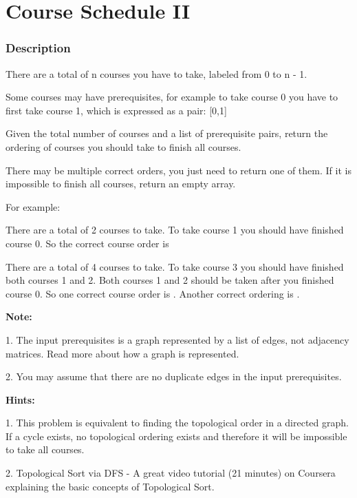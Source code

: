 \newpage

\section{Course Schedule II} %

\subsubsection{Description}

There are a total of n courses you have to take, labeled from 0 to n - 1.

Some courses may have prerequisites, for example to take course 0 you have to first take course 1, which is expressed as a pair: [0,1]

Given the total number of courses and a list of prerequisite pairs, return the ordering of courses you should take to finish all courses.

There may be multiple correct orders, you just need to return one of them. If it is impossible to finish all courses, return an empty array.

For example:


There are a total of 2 courses to take. To take course 1 you should have finished course 0. So the correct course order is \code{[0,1]}


There are a total of 4 courses to take. To take course 3 you should have finished both courses 1 and 2. Both courses 1 and 2 should be taken after you finished course 0. So one correct course order is \code{[0,1,2,3]}. Another correct ordering is \code{[0,2,1,3]}.

\textbf{Note:}

1. The input prerequisites is a graph represented by a list of edges, not adjacency matrices. Read more about how a graph is represented.

2. You may assume that there are no duplicate edges in the input prerequisites.

\textbf{Hints:}

1. This problem is equivalent to finding the topological order in a directed graph. If a cycle exists, no topological ordering exists and therefore it will be impossible to take all courses.

2. Topological Sort via DFS - A great video tutorial (21 minutes) on Coursera explaining the basic concepts of Topological Sort.

